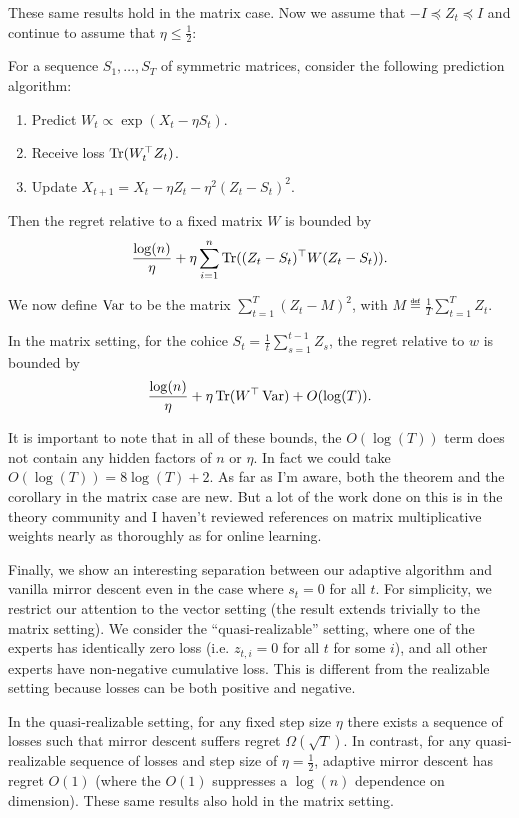 \documentclass[11pt]{article}
\begin{document}
These same results hold in the matrix case. Now we assume that $-I \preceq Z_t \preceq I$ 
and continue to assume that $\eta \leq \frac{1}{2}$:
\begin{theorem}
For a sequence $S_1, \ldots, S_T$ of symmetric matrices, consider the following 
prediction algorithm:
\begin{enumerate}
\item Predict $W_t \propto \exp(X_t - \eta S_t)$.
\item Receive loss $\operatorname{Tr}(W_t^{\top}Z_t)$.
\item Update $X_{t+1} = X_t - \eta Z_t - \eta^2 (Z_t-S_t)^2$.
\end{enumerate}
Then the regret relative to a fixed matrix $W$ is bounded by
\[ \frac{\log(n)}{\eta} + \eta \sum_{i=1}^n \operatorname{Tr}((Z_t-S_t)^{\top}W(Z_t-S_t)). \]
\end{theorem}
We now define $\operatorname{Var}$ to be the matrix $\sum_{t=1}^T (Z_t-M)^2$, with $M \eqdef \frac{1}{T} \sum_{t=1}^T Z_t$.
\begin{corollary}
In the matrix setting, for the cohice $S_t = \frac{1}{t} \sum_{s=1}^{t-1} Z_s$, the 
regret relative to $w$ is bounded by
\[ \frac{\log(n)}{\eta} + \eta \operatorname{Tr}(W^{\top}\operatorname{Var}) + O(\log(T)). \]
\end{corollary}
It is important to note that in all of these bounds, the $O(\log(T))$ term does not 
contain any hidden factors of $n$ or $\eta$. In fact we could take $O(\log(T)) = 8\log(T) + 2$.
As far as I'm aware, both the theorem and the corollary in the matrix case are new. But 
a lot of the work done on this is in the theory community and I haven't reviewed 
references on matrix multiplicative weights nearly as thoroughly as for online learning.

Finally, we show an interesting separation between our adaptive algorithm and vanilla mirror 
descent even in the case where $s_t = 0$ for all $t$. For simplicity, we restrict our attention to the vector 
setting (the result extends trivially to the matrix setting). We consider the ``quasi-realizable'' setting, 
where one of the experts has identically zero loss (i.e. $z_{t,i} = 0$ for all $t$ for some $i$), and all 
other experts have non-negative cumulative loss. This is different from the realizable setting because 
losses can be both positive and negative.

\begin{proposition}
In the quasi-realizable setting, for any fixed step size $\eta$ there 
exists a sequence of losses such that mirror descent suffers regret $\Omega(\sqrt{T})$. 
In contrast, for any quasi-realizable sequence of losses and step size of $\eta = \frac{1}{2}$, 
adaptive mirror descent has regret $O(1)$ (where the $O(1)$ suppresses a $\log(n)$ dependence 
on dimension). These same results also hold in the matrix setting.
\end{proposition}
\end{document}
